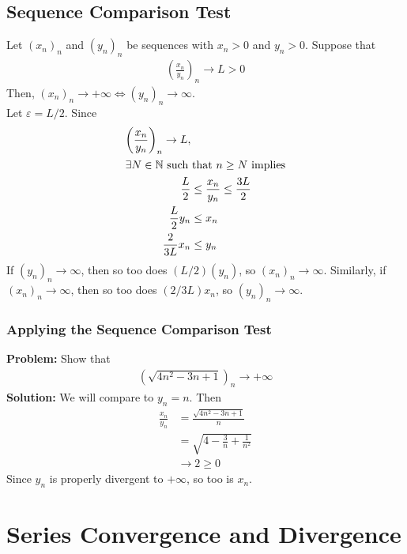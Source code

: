 \documentclass[10pt]{extarticle}
\newcommand{\N}{\mathbb{N}}
\begin{document}
  \subsection{Sequence Comparison Test}%
    Let $(x_n)_n$ and $(y_n)_n$ be sequences with $x_n > 0$ and $y_n > 0$. Suppose that 
    \begin{align*}
      \left(\frac{x_n}{y_n}\right)_n \rightarrow L > 0
    \end{align*}
    Then, $(x_n)_n \rightarrow +\infty \Leftrightarrow (y_n)_n \rightarrow \infty$.\\

    Let $\varepsilon = L/2$. Since
    \begin{align*}
      \left(\frac{x_n}{y_n}\right)_n \rightarrow L,\\
      \shortintertext{$\exists N \in\N$ such that $n\geq N$ implies}
      \frac{L}{2} &\leq \frac{x_n}{y_n} \leq \frac{3L}{2}\\
      \frac{L}{2}y_n  &\leq x_n\\
      \frac{2}{3L}x_n &\leq y_n
    \end{align*}
    If $(y_n)_n \rightarrow \infty$, then so too does $(L/2)(y_n)$, so $(x_n)_n\rightarrow\infty$. Similarly, if $(x_n)_n\rightarrow\infty$, then so too does $(2/3L)x_n$, so $(y_n)_n\rightarrow\infty$.\\
  \subsubsection{Applying the Sequence Comparison Test}%
  \textbf{Problem:} Show that
    \begin{align*}
      \left(\sqrt{4n^2 -3n + 1}\right)_n \rightarrow +\infty
    \end{align*}
    \textbf{Solution:} We will compare to $y_n = n$. Then
    \begin{align*}
      \frac{x_n}{y_n} &= \frac{\sqrt{4n^2-3n+1}}{n}\\
                      &= \sqrt{4 - \frac{3}{n} + \frac{1}{n^2}}\\
                      &\rightarrow 2 \geq 0
    \end{align*}
    Since $y_n$ is properly divergent to $+\infty$, so too is $x_n$.
  \section{Series Convergence and Divergence}%
\end{document}
